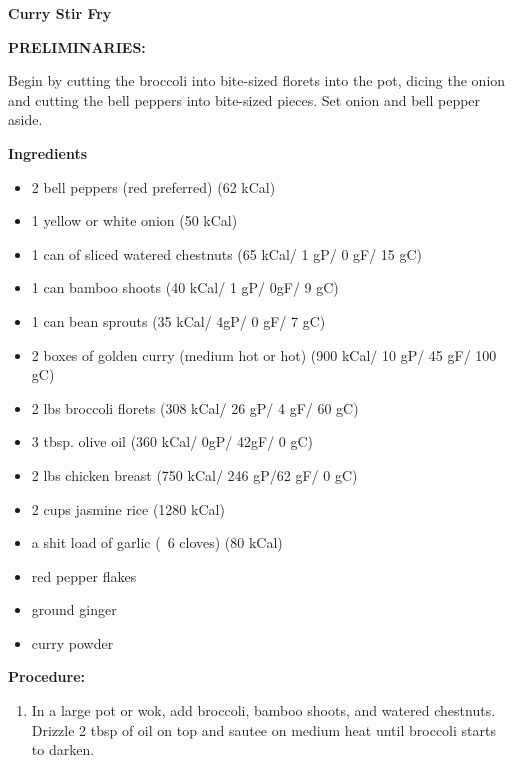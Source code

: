 \documentclass{report}
\begin{document}
\begin{centering}
    \Huge{\textbf{Curry Stir Fry}}
    
\end{centering}
\vspace{8mm}
\textbf{PRELIMINARIES:}


Begin by cutting the broccoli into bite-sized florets into the pot, dicing the onion and cutting the bell peppers into bite-sized pieces. Set onion and bell pepper aside. 

\bigskip

\bigskip

\begin{multicols}{2}
\textbf{Ingredients}
\begin{itemize}
\item 2 bell peppers (red preferred) \qquad (62 kCal)

\item 1 yellow or white onion \qquad (50 kCal)
\item 1 can of sliced watered chestnuts \quad (65 kCal/ 1 gP/ 0 gF/ 15 gC)
\item 1 can bamboo shoots \quad (40 kCal/ 1 gP/ 0gF/ 9 gC)
\item 1 can bean sprouts \quad (35 kCal/ 4gP/ 0 gF/ 7 gC)
\item 2 boxes of golden curry (medium hot or hot) \newline (900 kCal/ 10 gP/ 45 gF/ 100 gC)
\item 2 lbs broccoli florets \quad (308 kCal/ 26 gP/ 4 gF/ 60 gC)
\item 3 tbsp. olive oil \quad (360 kCal/ 0gP/ 42gF/ 0 gC)
\item 2 lbs chicken breast \quad (750 kCal/ 246 gP/62 gF/ 0 gC)
\item 2 cups jasmine rice \qquad (1280 kCal)
\item a shit load of garlic (~6 cloves) \qquad  (80 kCal)
\item red pepper flakes
\item ground ginger
\item curry powder 


\end{itemize}


\columnbreak
\textbf{Procedure:}
\medskip


\begin{enumerate}
\item In a large pot or wok, add broccoli, bamboo shoots, and watered chestnuts. Drizzle 2 tbsp of oil on top and sautee on medium heat until broccoli starts to darken.



\end{enumerate}
\end{multicols}
\end{document}
